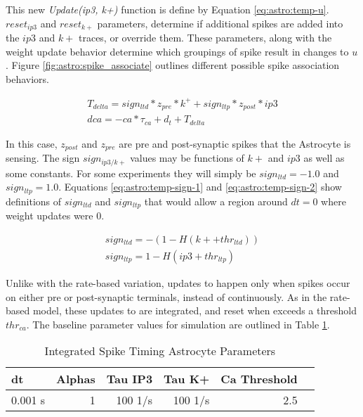 This new \emph{Update(ip3, k+)} function is define by Equation
\ref{eq:astro:temp-u}. $reset_{ip3}$ and $reset_{k+}$ parameters, determine if
additional spikes are added into the $ip3$ and $k+$ traces, or override
them. These parameters, along with the weight update behavior determine which
groupings of spike result in changes to $u$. Figure
\ref{fig:astro:spike_associate} outlines different possible spike association
behaviors.



\begin{align}
T_{delta} = sign_{ltd} * z_{pre} * k^+ + sign_{ltp} * z_{post} * ip3 \\
dca = -ca * \tau_{ca} + d_t + T_{delta} \label{eq:astro:temp-u}
\end{align}

In this case, $z_{post}$ and $z_{pre}$ are pre and post-synaptic spikes that
the Astrocyte is sensing. The sign $sign_{ip3/k+}$ values may be functions
of $k+$ and $ip3$ as well as some constants. For some experiments they will
simply be $sign_{ltd}=-1.0$ and $sign_{ltp}=1.0$. Equations
\ref{eq:astro:temp-sign-1} and \ref{eq:astro:temp-sign-2} show definitions
of $sign_{ltd}$ and $sign_{ltp}$ that would allow a region around $dt=0$
where weight updates were 0.

\begin{align}
sign_{ltd} = -(1 - H(k+ + thr_{ltd})) \label{eq:astro:temp-sign-1}\\
sign_{ltp} = 1 - H(ip3 + thr_{ltp}) \label{eq:astro:temp-sign-2}
\end{align}

Unlike with the rate-based variation, updates to \ca happen only when spikes
occur on either pre or post-synaptic terminals, instead of continuously. As
in the rate-based model, these updates to \ca are integrated, and reset when \ca
exceeds a threshold $thr_{ca}$. The baseline parameter values for simulation are
outlined in Table \ref{table:istp_params}.

\begin{table}[!htp] \centering
  \caption{Integrated Spike Timing Astrocyte Parameters} \label{table:istp_params}
  \scriptsize
  \begin{tabular}{lrrrrr}\toprule
    dt &Alphas &Tau IP3 &Tau K+ &Ca Threshold \\\midrule
    0.001 s &1 &100 1/s &100 1/s &2.5 \\
    \bottomrule
  \end{tabular}
\end{table}

